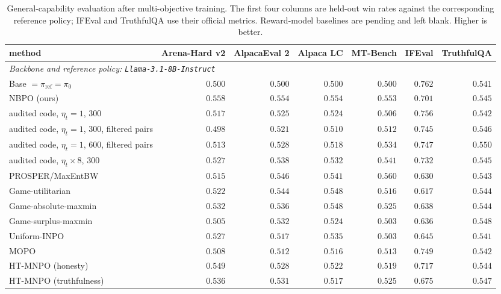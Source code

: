 \documentclass{article}
\theoremstyle{remark}
\theoremstyle{plain}
\newcommand{\piref}{\pi_{\mathrm{ref}}}
\newcommand{\NBPO}{\textsc{NBPO}}
\begin{document}
\begin{table}[t]
\centering\scriptsize
\setlength{\tabcolsep}{1.6pt}
\caption{General-capability evaluation after multi-objective training. The first four columns are held-out win rates against the corresponding reference policy; IFEval and TruthfulQA use their official metrics. Reward-model baselines are pending and left blank. Higher is better.}
\label{tab:general-benchmark-completion}
\begin{tabular}{lrrrrrr}
\toprule
method & Arena-Hard v2 & AlpacaEval 2 & Alpaca LC & MT-Bench & IFEval & TruthfulQA \\
\midrule
\multicolumn{7}{l}{\textit{Backbone and reference policy: \texttt{Llama-3.1-8B-Instruct}}}\\
Base $=\piref=\pi_0$ & $0.500$ & $0.500$ & $0.500$ & $0.500$ & $\mathbf{0.762}$ & $0.541$ \\
\NBPO{} (ours) & $\mathbf{0.558}$ & $\mathbf{0.554}$ & $\mathbf{0.554}$ & $0.553$ & $0.701$ & $0.545$ \\
\quad audited code, $\eta_t{=}1$, $300$ & $0.517$ & $0.525$ & $0.524$ & $0.506$ & $0.756$ & $0.542$ \\
\quad audited code, $\eta_t{=}1$, $300$, filtered pairs & $0.498$ & $0.521$ & $0.510$ & $0.512$ & $0.745$ & $0.546$ \\
\quad audited code, $\eta_t{=}1$, $600$, filtered pairs & $0.513$ & $0.528$ & $0.518$ & $0.534$ & $0.747$ & $0.550$ \\
\quad audited code, $\eta_t{\times}8$, $300$ & $0.527$ & $0.538$ & $0.532$ & $0.541$ & $0.732$ & $0.545$ \\
PROSPER/MaxEntBW & $0.515$ & $0.546$ & $0.541$ & $\mathbf{0.560}$ & $0.630$ & $0.543$ \\
Game-utilitarian & $0.522$ & $0.544$ & $0.548$ & $0.516$ & $0.617$ & $0.544$ \\
Game-absolute-maxmin & $0.532$ & $0.536$ & $0.548$ & $0.525$ & $0.638$ & $0.544$ \\
Game-surplus-maxmin & $0.505$ & $0.532$ & $0.524$ & $0.503$ & $0.636$ & $\mathbf{0.548}$ \\
Uniform-INPO & $0.527$ & $0.517$ & $0.535$ & $0.503$ & $0.645$ & $0.541$ \\
MOPO & $0.508$ & $0.512$ & $0.516$ & $0.513$ & $0.749$ & $0.542$ \\
HT-MNPO (honesty) & $0.549$ & $0.528$ & $0.522$ & $0.519$ & $0.717$ & $0.544$ \\
HT-MNPO (truthfulness) & $0.536$ & $0.531$ & $0.517$ & $0.525$ & $0.675$ & $0.547$ \\

\end{tabular}
\end{table}
\end{document}
